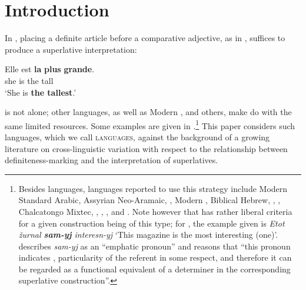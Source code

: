 \documentclass[output=paper
,modfonts
,nonflat]{langsci/langscibook}
\author{%
 Elizabeth Coppock\affiliation{Boston University \\ University of Gothenburg}\lastand 
 Linnea Strand\affiliation{University of Gothenburg}
}
\begin{document}

\maketitle
\section{Introduction} 
In , placing a definite article before a comparative adjective, as in , suffices to produce a superlative interpretation:

\ea \label{ex:coppockstrand:1}
\gll Elle est \textbf{la} \textbf{plus} \textbf{grande}.\\
she is the \cmpr{} tall\\ 
\glt `She is \textbf{the tallest}.' 
\z

 is not alone; other  languages, as well as Modern ,  and others, make do with the same limited resources. Some examples are given in .\footnote{Besides  languages, languages reported to use this strategy include 
Modern Standard Arabic, Assyrian Neo-Aramaic, , Modern , Biblical Hebrew, , , Chalcatongo Mixtec, , , , and  \citep{Bobaljik2012,Gorshenin2012}. Note however that \citeauthor{Gorshenin2012} has rather liberal criteria for a given construction being of this type; for , the example given is \textit{Etot \v{z}urnal \textbf{sam-yj} interesn-yj} `This magazine is the most interesting (one)'. \citet[129]{Gorshenin2012} describes \textit{sam-yj} as an ``emphatic pronoun'' and reasons that ``this pronoun indicates , particularity of the referent in some respect, and therefore it can be regarded as a functional equivalent of a determiner in the corresponding superlative construction''.} This paper considers such languages, which we call  \textsc{languages}, against the background of a growing literature on cross-linguistic variation with respect to the relationship between definiteness-marking and the interpretation of superlatives.
\end{document}
